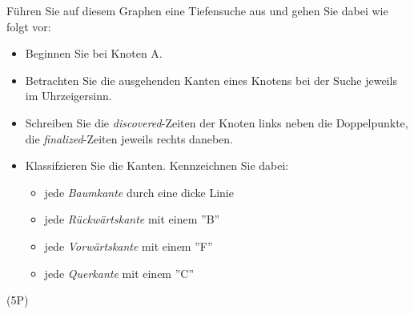 \documentclass{scrartcl}
\begin{document}
\begin{enumerate}[(1)]
\begin{center}
\end{center}
Führen Sie auf diesem Graphen eine Tiefensuche aus und gehen Sie dabei wie folgt vor:
\begin{itemize}
	\item Beginnen Sie bei Knoten A.
	\item Betrachten Sie die ausgehenden Kanten eines Knotens bei der Suche jeweils im Uhrzeigersinn.
	\item Schreiben Sie die \textit{discovered}-Zeiten der Knoten links neben die Doppelpunkte, die \textit{finalized}-Zeiten jeweils rechts daneben.
	\item Klassifzieren Sie die Kanten. Kennzeichnen Sie dabei:
	\begin{itemize}
		\item jede \textit{Baumkante} durch eine dicke Linie
		\item jede \textit{Rückwärtskante} mit einem ''B''
		\item jede \textit{Vorwärtskante} mit einem ''F''
		\item jede \textit{Querkante} mit einem ''C''
	\end{itemize} 
\end{itemize}
(5P)
\end{enumerate}
\end{document}
